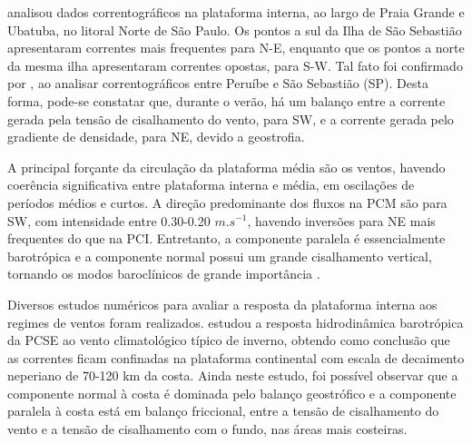 
\hspace{5mm} \cite{valente1999circulaccao} analisou dados correntográficos na plataforma interna, ao largo de Praia Grande e Ubatuba, no litoral Norte de São Paulo. Os pontos a sul da Ilha de São Sebastião apresentaram correntes mais frequentes para N-E, enquanto que os pontos a norte da mesma ilha apresentaram correntes opostas, para S-W. Tal fato foi confirmado por \cite{mazzini2009correntes}, ao analisar correntográficos entre Peruíbe e São Sebastião (SP). Desta forma, pode-se constatar que, durante o verão, há um balanço entre a corrente gerada pela tensão de cisalhamento do vento, para SW, e a corrente gerada pelo gradiente de densidade, para NE, devido a geostrofia.


\hspace{5mm} A principal forçante da circulação da plataforma média são os ventos, havendo coerência significativa entre plataforma interna e média, em oscilações de períodos médios e curtos. A direção predominante dos fluxos na PCM são para SW, com intensidade entre 0.30-0.20 $m.s^{-1}$, havendo inversões para NE mais frequentes do que na PCI. Entretanto, a componente paralela é essencialmente barotrópica e  a componente normal possui um grande cisalhamento vertical, tornando os modos baroclínicos de grande importância \citep{castro1996correntes}.

\hspace{5mm} Diversos estudos numéricos para avaliar a resposta da plataforma interna aos regimes de ventos foram realizados. \cite{castro1985subtidal} estudou a resposta hidrodinâmica barotrópica da PCSE ao vento climatológico típico de inverno, obtendo como conclusão que as correntes ficam confinadas na plataforma continental com escala de decaimento neperiano de 70-120 km da costa. Ainda neste estudo, foi possível observar que a componente normal à costa é dominada pelo balanço geostrófico e a componente paralela à costa está em balanço friccional, entre a tensão de cisalhamento do vento e a tensão de cisalhamento com o fundo, nas áreas mais costeiras.

